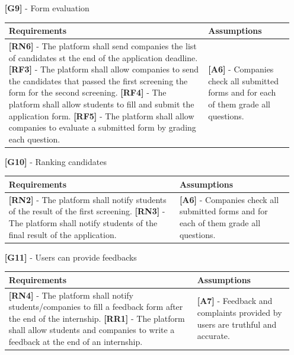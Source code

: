 \documentclass[11pt,twoside]{article}
\begin{document}
\begin{itemize}
\item[\textbf{[G9]}] - Form evaluation
\begin{table}[H]
\begin{tabular}{| p{} | p{} |}
\hline
\textbf{Requirements} & \textbf{Assumptions} \\
\hline
\textbf{[RN6]} - The platform shall send companies the list of candidates st the end of the application deadline. \newline
\textbf{[RF3]} - The platform shall allow companies to send the candidates that passed the first screening the form for the second screening. \newline
\textbf{[RF4]} - The platform shall allow students to fill and submit the application form. \newline
\textbf{[RF5]} - The platform shall allow companies to evaluate a submitted form by grading each question.
& \textbf{[A6]} - Companies check all submitted forms and for each of them grade all questions. \\
\hline
\end{tabular}
\end{table}

\item[\textbf{[G10]}] - Ranking candidates
\begin{table}[H]
\begin{tabular}{| p{} | p{} |}
\hline
\textbf{Requirements} & \textbf{Assumptions} \\
\hline
\textbf{[RN2]} - The platform shall notify students of the result of the first screening. \newline
\textbf{[RN3]} - The platform shall notify students of the final result of the application.
& \textbf{[A6]} - Companies check all submitted forms and for each of them grade all questions. \\
\hline
\end{tabular}
\end{table}

\item[\textbf{[G11]}] - Users can provide feedbacks
\begin{table}[H]
\begin{tabular}{| p{} | p{} |}
\hline
\textbf{Requirements} & \textbf{Assumptions} \\
\hline
\textbf{[RN4]} - The platform shall notify students/companies to fill a feedback form after the end of the internship. \newline
\textbf{[RR1]} - The platform shall allow students and companies to write a feedback at the end of an internship.
& \textbf{[A7]} - Feedback and complaints provided by users are truthful and accurate. \\
\hline
\end{tabular}
\end{table}


\end{itemize}
\end{document}
